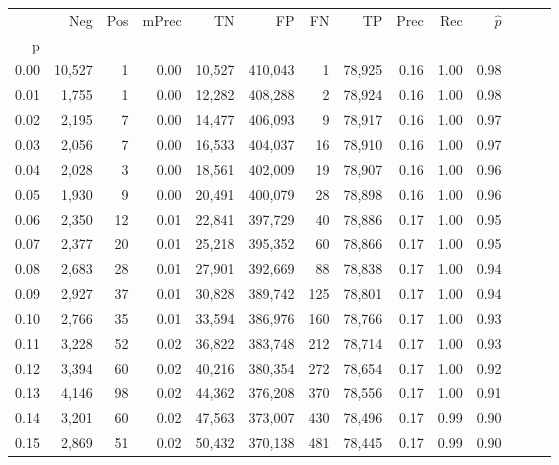 \begin{tabular}{rrrrrrrrrrrrrr}
\toprule
{} &     Neg &    Pos & mPrec &       TN &       FP &      FN &      TP &  Prec &   Rec & $\hat{p}$ \\
p    &         &        &       &          &          &         &         &       &       &           \\
\midrule
0.00 &  10,527 &      1 &  0.00 &   10,527 &  410,043 &       1 &  78,925 &  0.16 &  1.00 &      0.98 \\
0.01 &   1,755 &      1 &  0.00 &   12,282 &  408,288 &       2 &  78,924 &  0.16 &  1.00 &      0.98 \\
0.02 &   2,195 &      7 &  0.00 &   14,477 &  406,093 &       9 &  78,917 &  0.16 &  1.00 &      0.97 \\
0.03 &   2,056 &      7 &  0.00 &   16,533 &  404,037 &      16 &  78,910 &  0.16 &  1.00 &      0.97 \\
0.04 &   2,028 &      3 &  0.00 &   18,561 &  402,009 &      19 &  78,907 &  0.16 &  1.00 &      0.96 \\
0.05 &   1,930 &      9 &  0.00 &   20,491 &  400,079 &      28 &  78,898 &  0.16 &  1.00 &      0.96 \\
0.06 &   2,350 &     12 &  0.01 &   22,841 &  397,729 &      40 &  78,886 &  0.17 &  1.00 &      0.95 \\
0.07 &   2,377 &     20 &  0.01 &   25,218 &  395,352 &      60 &  78,866 &  0.17 &  1.00 &      0.95 \\
0.08 &   2,683 &     28 &  0.01 &   27,901 &  392,669 &      88 &  78,838 &  0.17 &  1.00 &      0.94 \\
0.09 &   2,927 &     37 &  0.01 &   30,828 &  389,742 &     125 &  78,801 &  0.17 &  1.00 &      0.94 \\
0.10 &   2,766 &     35 &  0.01 &   33,594 &  386,976 &     160 &  78,766 &  0.17 &  1.00 &      0.93 \\
0.11 &   3,228 &     52 &  0.02 &   36,822 &  383,748 &     212 &  78,714 &  0.17 &  1.00 &      0.93 \\
0.12 &   3,394 &     60 &  0.02 &   40,216 &  380,354 &     272 &  78,654 &  0.17 &  1.00 &      0.92 \\
0.13 &   4,146 &     98 &  0.02 &   44,362 &  376,208 &     370 &  78,556 &  0.17 &  1.00 &      0.91 \\
0.14 &   3,201 &     60 &  0.02 &   47,563 &  373,007 &     430 &  78,496 &  0.17 &  0.99 &      0.90 \\
0.15 &   2,869 &     51 &  0.02 &   50,432 &  370,138 &     481 &  78,445 &  0.17 &  0.99 &      0.90 \\

\end{tabular}

